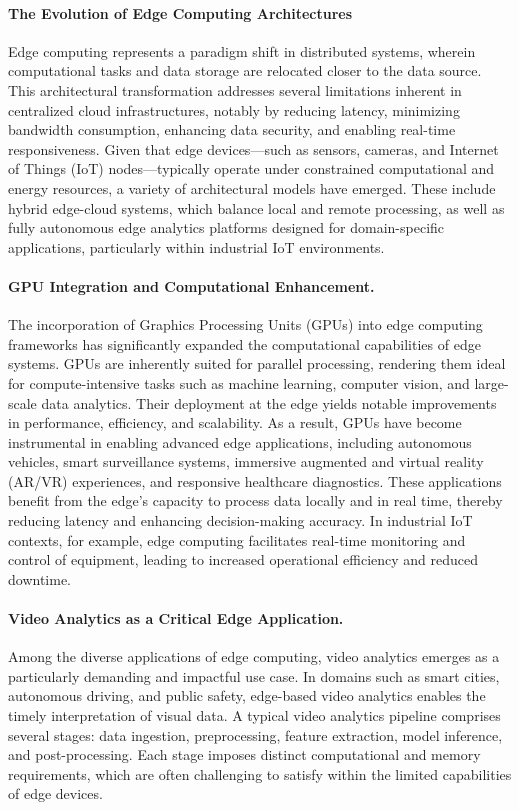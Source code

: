 \paragraph{The Evolution of Edge Computing Architectures}

Edge computing represents a paradigm shift in distributed systems, wherein computational tasks and data storage are relocated closer to the data source. This architectural transformation addresses several limitations inherent in centralized cloud infrastructures, notably by reducing latency, minimizing bandwidth consumption, enhancing data security, and enabling real-time responsiveness. Given that edge devices—such as sensors, cameras, and Internet of Things (IoT) nodes—typically operate under constrained computational and energy resources, a variety of architectural models have emerged. These include hybrid edge-cloud systems, which balance local and remote processing, as well as fully autonomous edge analytics platforms designed for domain-specific applications, particularly within industrial IoT environments.

\paragraph{GPU Integration and Computational Enhancement.}
The incorporation of Graphics Processing Units (GPUs) into edge computing frameworks has significantly expanded the computational capabilities of edge systems. GPUs are inherently suited for parallel processing, rendering them ideal for compute-intensive tasks such as machine learning, computer vision, and large-scale data analytics. Their deployment at the edge yields notable improvements in performance, efficiency, and scalability. As a result, GPUs have become instrumental in enabling advanced edge applications, including autonomous vehicles, smart surveillance systems, immersive augmented and virtual reality (AR/VR) experiences, and responsive healthcare diagnostics. These applications benefit from the edge's capacity to process data locally and in real time, thereby reducing latency and enhancing decision-making accuracy. In industrial IoT contexts, for example, edge computing facilitates real-time monitoring and control of equipment, leading to increased operational efficiency and reduced downtime.

\paragraph{Video Analytics as a Critical Edge Application.}
Among the diverse applications of edge computing, video analytics emerges as a particularly demanding and impactful use case. In domains such as smart cities, autonomous driving, and public safety, edge-based video analytics enables the timely interpretation of visual data. A typical video analytics pipeline comprises several stages: data ingestion, preprocessing, feature extraction, model inference, and post-processing. Each stage imposes distinct computational and memory requirements, which are often challenging to satisfy within the limited capabilities of edge devices.

